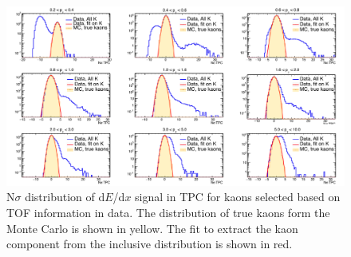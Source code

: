 \begin{figure}[!h]
 \centering
 \includegraphics[angle=0, width=15cm]{./FigCap5/KaonTPCFromTOF_DataMC.png}
 \caption{N$\sigma$ distribution of d$E$/d$x$ signal in TPC for kaons selected based on TOF information in data. The distribution of true kaons form the Monte Carlo is shown in yellow. The fit to extract the kaon component from the inclusive distribution is shown in red.}
 \label{fig:DataKaonsTPC} 
\end{figure}

